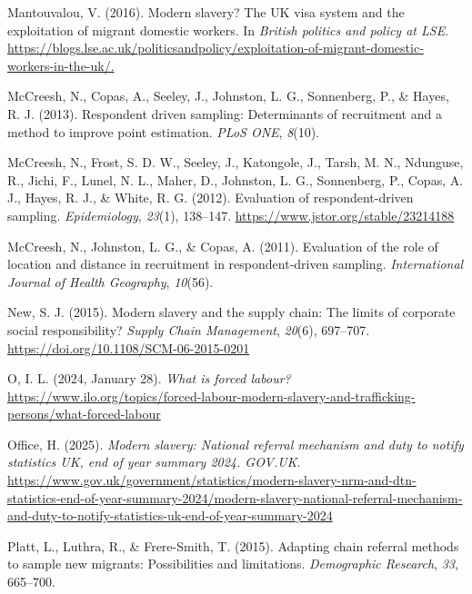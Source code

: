 \documentclass[
  12pt,
]{article}
\newlength{\cslhangindent}
\newenvironment{CSLReferences}[2] %
 {\begin{list}{}{%
  \setlength{\itemindent}{0pt}
  \setlength{\leftmargin}{0pt}
  \setlength{\parsep}{0pt}
  \ifodd #1
   \setlength{\leftmargin}{\cslhangindent}
   \setlength{\itemindent}{-1\cslhangindent}
  \fi
  \setlength{\itemsep}{#2\baselineskip}}}
 {\end{list}}
\theoremstyle{plain}
\theoremstyle{definition}
\begin{document}
\begin{CSLReferences}{1}{0}
Mantouvalou, V. (2016). Modern slavery? The {UK} visa system and the
exploitation of migrant domestic workers. In \emph{British politics and
policy at {LSE}}.
\url{https://blogs.lse.ac.uk/politicsandpolicy/exploitation-of-migrant-domestic-workers-in-the-uk/.}

McCreesh, N., Copas, A., Seeley, J., Johnston, L. G., Sonnenberg, P., \&
Hayes, R. J. (2013). Respondent driven sampling: Determinants of
recruitment and a method to improve point estimation. \emph{{PLoS}
{ONE}}, \emph{8}(10).

McCreesh, N., Frost, S. D. W., Seeley, J., Katongole, J., Tarsh, M. N.,
Ndunguse, R., Jichi, F., Lunel, N. L., Maher, D., Johnston, L. G.,
Sonnenberg, P., Copas, A. J., Hayes, R. J., \& White, R. G. (2012).
Evaluation of respondent-driven sampling. \emph{Epidemiology},
\emph{23}(1), 138--147. \url{https://www.jstor.org/stable/23214188}

McCreesh, N., Johnston, L. G., \& Copas, A. (2011). Evaluation of the
role of location and distance in recruitment in respondent-driven
sampling. \emph{International Journal of Health Geography},
\emph{10}(56).

New, S. J. (2015). Modern slavery and the supply chain: The limits of
corporate social responsibility? \emph{Supply Chain Management},
\emph{20}(6), 697--707. \url{https://doi.org/10.1108/SCM-06-2015-0201}

O, I. L. (2024, January 28). \emph{What is forced labour?}
\url{https://www.ilo.org/topics/forced-labour-modern-slavery-and-trafficking-persons/what-forced-labour}

Office, H. (2025). \emph{Modern slavery: National referral mechanism and
duty to notify statistics {UK}, end of year summary 2024. {GOV}.{UK}}.
\url{https://www.gov.uk/government/statistics/modern-slavery-nrm-and-dtn-statistics-end-of-year-summary-2024/modern-slavery-national-referral-mechanism-and-duty-to-notify-statistics-uk-end-of-year-summary-2024}

Platt, L., Luthra, R., \& Frere-Smith, T. (2015). Adapting chain
referral methods to sample new migrants: Possibilities and limitations.
\emph{Demographic Research}, \emph{33}, 665--700.


\end{CSLReferences}
\end{document}
